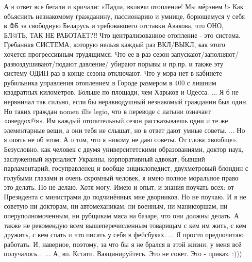 А в ответ все бегали и кричали: «Падла, включи отопление! Мы мёрзнем !»
Как объяснить незнакомому гражданину, пассионарию и умнице, борющемуся у себя в ФБ за свободную Беларусь и требовавшего отставки Авакова, что ОНО, БЛ@ТЬ, ТАК НЕ РАБОТАЕТ?!!
Что централизованное отопление - это система.
Гребанная СИСТЕМА, которую нельзя каждый раз ВКЛ/ВЫКЛ, как этого хочется прогрессивным трудящимся.
Что ее в раз сезон запускают/заполняют/развоздушивают/подают давление/ убирают порывы и пр.пр. и также эту систему ОДИН раз в конце сезона отключают.
Что у мэра нет в кабинете рубильника управления отоплением в Городе размером в 400 с лишним квадратных километров. 
Больше по площади, чем Харьков и Одесса.
...
Я б не нервничал так сильно, если бы неравнодушный незнакомый гражданин был один.
Но таких граждан nomen illis legio, что в переводе с латыни означает «овердох@я».
Им каждый отопительный сезон рассказываешь одни и те же элементарные вещи, а они тебя не слышат, но в ответ дают умные советы.
...
Но я опять не об этом.
А о том, что я никому не даю советы. 
От слова «вообще».
Безусловно, как человек с двумя университетскими образованиями, доктор наук, заслуженный журналист Украины, корпоративный адвокат, бывший парламентарий, госуправленец и вообще энциклопедист, двухметровый блондин с голубыми глазами и очень скромный человек, я имею полное моральное право это делать.
Но не делаю.
Хотя могу. 
Имею и опыт, и знания поучать всех: от Президента с министрами до подчинённых мне дворников.
Но не поучаю.
И я не советую ни докторам, ни автомеханикам, ни военным, ни маникюршам, ни оперуполномоченным, ни рубщикам мяса на базаре, что они должны делать.
А также не рекомендую всем вышеперечисленным товарищам с кем им жить, с кем дружить, с кем спать и что писать у себя в фейсбуках.
...
Я просто предпочитаю работать.
И, наверное, поэтому, за что бы я не брался в этой жизни, у меня всё получалось...
...
А, во.
Кстати.
Вакцинируйтесь. 
Это не совет. Это - приказ.
:)))
\restorecr

